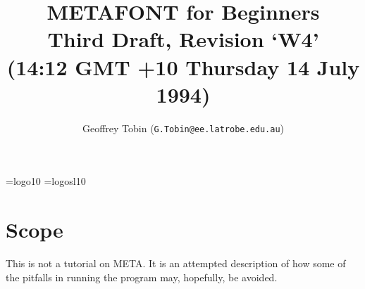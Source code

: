 

\oddsidemargin=0in
\evensidemargin=0in
\marginparwidth=0in
\marginparsep=0in


\textwidth=6.25in


\addtolength{\textheight}{\topmargin}
\topmargin=0in
\addtolength{\textheight}{0.4in}

\font\mf=logo10
\font\mfsl=logosl10
\hyphenchar{}
\hyphenchar{}
\newcommand{\MF}{{\mf META}\-{\mf FONT\/}}
\newcommand{\MFSL}{{\mfsl META}\-{\mfsl FONT\/}}
\newcommand{\MFbook}{{\sl The \MFSL{}book\/}}
\newcommand{\TeXbook}{{\sl The \TeX{}book\/}}
\newcommand{\BibTeX}{{\rm B\kern-.05em{\sc i\kern-.025em b}\kern-.08em
                      T\kern-.1667em\lower.7ex\hbox{E}\kern-.125emX}}
\newcommand{\ttbsl}{{\tt \char`\\\/}}  %

\title{%
  \vspace*{-1in}%
  METAFONT for Beginners\\%
  {\normalsize Third Draft, Revision `W4'}\\%
  {\normalsize (14:12 GMT +10  Thursday 14 July 1994)}%
}

\date{}

\author{Geoffrey {\sc Tobin} ({\tt G.Tobin@ee.latrobe.edu.au})}



\maketitle

\tableofcontents

\newpage


\section*{Scope}%

This is not a tutorial on \MF{}.  It is an attempted description of
how some of the pitfalls in running the program may, hopefully, be
avoided.


